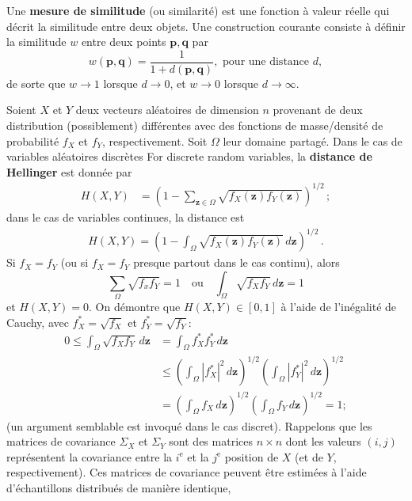 Une \textbf{mesure de similitude} (ou similarit\'e) est une fonction à valeur réelle qui décrit la similitude entre deux objets.
Une construction courante consiste à définir la similitude $w$ entre deux points $\mathbf{p},\mathbf{q}$ par $$w(\mathbf{p}, \mathbf{q})=\frac{1}{1+d(\mathbf{p},\mathbf{q})}, \text{ pour une distance }d,$$ de sorte que $w\to 1$ lorsque $d\to 0$, et $w\to 0$ lorsque $d\to \infty$. \par  
Soient $X$ et $Y$ deux vecteurs aléatoires de dimension $n$ provenant de deux distribution (possiblement) différentes avec des fonctions de masse/densité de probabilité $f_X$ et $f_Y$, respectivement. Soit $\Omega$ leur domaine partagé.
Dans le cas de variables al\'eatoires discr\`etes For discrete random variables, la  \textbf{distance de Hellinger} est donn\'ee par  
\begin{align*}
H(X,Y)&=\left(1- \sum_{\mathbf{z} \in \Omega} \sqrt{f_X(\mathbf{z}) f_Y(\mathbf{z})}\right)^{1/2}\,;
\end{align*}
dans le cas de variables continues, la distance est 
\begin{align*}
H(X,Y)= \left(1-\int_{\Omega} \sqrt{f_X(\mathbf{z}) f_Y(\mathbf{z})}\, d\mathbf{z}\right)^{1/2}\,. 
\end{align*} 
Si $f_X=f_Y$ (ou si $f_X=f_Y$ presque partout dans le cas continu), alors $$\sum_{\Omega}\sqrt{f_xf_Y}=1 \quad\mbox{ou} \quad \int_{\Omega}\sqrt{f_Xf_Y}\, d\mathbf{z}=1$$ et $H(X,Y)=0$. On d\'emontre que  $H(X,Y)\in [0,1]$ \`a l'aide de l'in\'egalit\'e de Cauchy, avec $f_X^*=\sqrt{f_X}$ et $f_Y^*=\sqrt{f_Y}$: \begin{align*}0\leq\int_{\Omega}\sqrt{f_Xf_Y}\, d\mathbf{z}&=\int_{\Omega}f_X^*f_Y^*\, d\mathbf{z}\\ &\leq \left(\int_{\Omega}|f_X^*|^2\, d\mathbf{z}\right)^{1/2}\left(\int_{\Omega}|f_Y^*|^2\, d\mathbf{z}\right)^{1/2} \\ &=\left(\int_{\Omega}f_X\, d\mathbf{z}\right)^{1/2}\left(\int_{\Omega}f_Y\, d\mathbf{z}\right)^{1/2}\!\!\!\!=1;\end{align*}
(un argument semblable est invoqué dans le cas discret). 
\newline\newline Rappelons que les matrices de covariance $\Sigma_X$ et $\Sigma_Y$ sont des matrices $n \times n$ dont les valeurs $(i,j)$ repr\'esentent la covariance entre la $i^{\text{e}}$ et la $j^{\text{e}}$ position de $X$ (et de $Y$, respectivement). Ces matrices de covariance peuvent être estimées \`a l'aide d'échantillons distribués de manière identique, 


